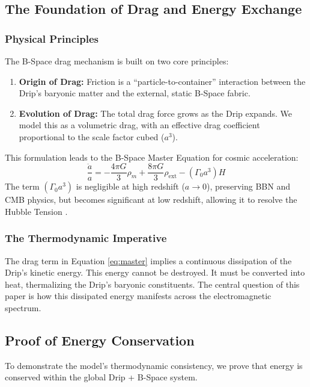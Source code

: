 \documentclass{BSpacePaper} %
\begin{document}
\begin{appendices}
\subsection{The Foundation of Drag and Energy Exchange}

\subsubsection{Physical Principles}
The B-Space drag mechanism is built on two core principles:
\begin{enumerate}
    \item \textbf{Origin of Drag:} Friction is a ``particle-to-container'' interaction between the Drip's baryonic matter and the external, static B-Space fabric.
    \item \textbf{Evolution of Drag:} The total drag force grows as the Drip expands. We model this as a volumetric drag, with an effective drag coefficient proportional to the scale factor cubed ($a^3$).
\end{enumerate}
This formulation leads to the B-Space Master Equation for cosmic acceleration:
\begin{equation}
    \frac{\ddot{a}}{a} = -\frac{4\pi G}{3}\rho_m + \frac{8\pi G}{3}\rho_{\text{ext}} - \left(\Gamma_0 a^3\right) H
    \label{eq:master}
\end{equation}
The term $(\Gamma_0 a^3)$ is negligible at high redshift ($a \to 0$), preserving BBN and CMB physics, but becomes significant at low redshift, allowing it to resolve the Hubble Tension \citep{Riess2022, Planck2020}.

\subsubsection{The Thermodynamic Imperative}
The drag term in Equation \ref{eq:master} implies a continuous dissipation of the Drip's kinetic energy. This energy cannot be destroyed. It must be converted into heat, thermalizing the Drip's baryonic constituents. The central question of this paper is how this dissipated energy manifests across the electromagnetic spectrum.

\subsection{Proof of Energy Conservation}
To demonstrate the model's thermodynamic consistency, we prove that energy is conserved within the global Drip + B-Space system.


\end{appendices}
\end{document}
